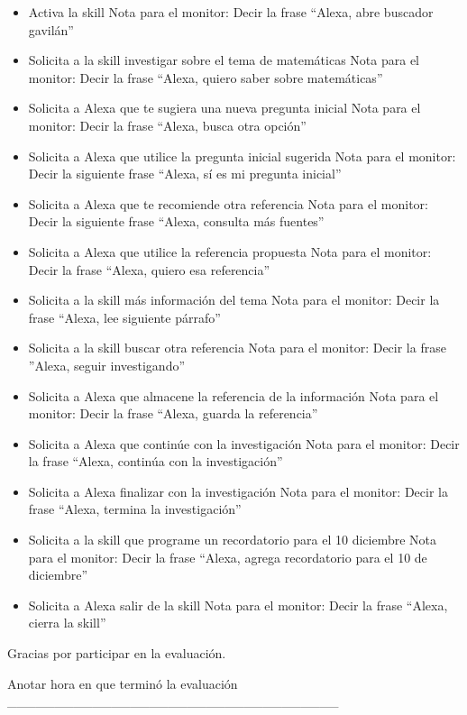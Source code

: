 \begin{tcolorbox}[colback=white!25!white,colframe=blue]
  \begin{itemize}
    \item Activa la skill
    Nota para el monitor: Decir la frase “Alexa, abre buscador gavilán”
    \item Solicita a la skill investigar sobre el tema de matemáticas
    Nota para el monitor: Decir la frase “Alexa, quiero saber sobre matemáticas”
    \item Solicita a Alexa que te sugiera una nueva pregunta inicial
    Nota para el monitor: Decir la frase “Alexa, busca otra opción”
    \item Solicita a Alexa que utilice la pregunta inicial sugerida
    Nota para el monitor: Decir la siguiente frase “Alexa, sí es mi pregunta inicial”
    \item Solicita a Alexa que te recomiende otra referencia
    Nota para el monitor: Decir la siguiente frase “Alexa, consulta más fuentes”
    \item Solicita a Alexa que utilice la referencia propuesta
    Nota para el monitor: Decir la frase “Alexa, quiero esa referencia”
    \item Solicita a la skill más información del tema
    Nota para el monitor: Decir la frase “Alexa, lee siguiente párrafo”
    \item Solicita a la skill buscar otra referencia
    Nota para el monitor: Decir la frase ”Alexa, seguir investigando”
    \item Solicita a Alexa que almacene la referencia de la información
    Nota para el monitor: Decir la frase “Alexa, guarda la referencia”
    \item Solicita a Alexa que continúe con la investigación
    Nota para el monitor: Decir la frase “Alexa, continúa con la investigación”
    \item Solicita a Alexa finalizar con la investigación
    Nota para el monitor: Decir la frase “Alexa, termina la investigación”
    \item Solicita a la skill que programe un recordatorio para el 10 diciembre
    Nota para el monitor: Decir la frase “Alexa, agrega recordatorio para el 10 de diciembre”
    \item Solicita a Alexa salir de la skill
    Nota para el monitor: Decir la frase “Alexa, cierra la skill”
  \end{itemize}

  Gracias por participar en la evaluación.

  Anotar hora en que terminó la evaluación \_\_\_\_\_\_\_\_\_\_\_\_\_\_\_\_\_\_\_\_\_\_\_\_\_\_\_\_\_\_\_\_\_\_\_
  

\end{tcolorbox}
